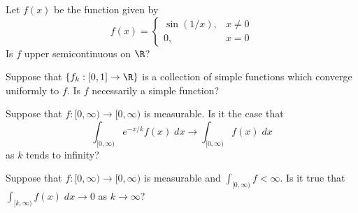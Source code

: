 \begin{quiz}
Let $f(x)$ be the function given by
	\[
	f(x)=
	\begin{cases}
	\sin(1/x), & x \neq 0 \\
	0, & x=0
	\end{cases}
	\]
Is $f$ upper semicontinuous on $\R$?
\end{quiz}


\begin{quiz}
Suppose that $\{f_k: [0,1] \to \R \}$ is a collection of simple functions which converge uniformly to $f$. Is $f$ necessarily a simple function? 
\end{quiz}










\begin{quiz}
Suppose that $f: [0,\infty) \to [0,\infty)$ is measurable. Is it the case that
	\[
	\int_{[0,\infty)} e^{-x/k} f(x) \; dx \longrightarrow \int_{[0,\infty)} f(x) \; dx 
	\]
as $k$ tends to infinity?
\end{quiz}




\begin{quiz}
Suppose that $f: [0,\infty) \to [0,\infty)$ is measurable and $\int_{[0,\infty)} f < \infty$. Is it true that $\int_{[k,\infty)} f(x) \; dx \to 0$ as $k \to \infty$? 
\end{quiz}



















